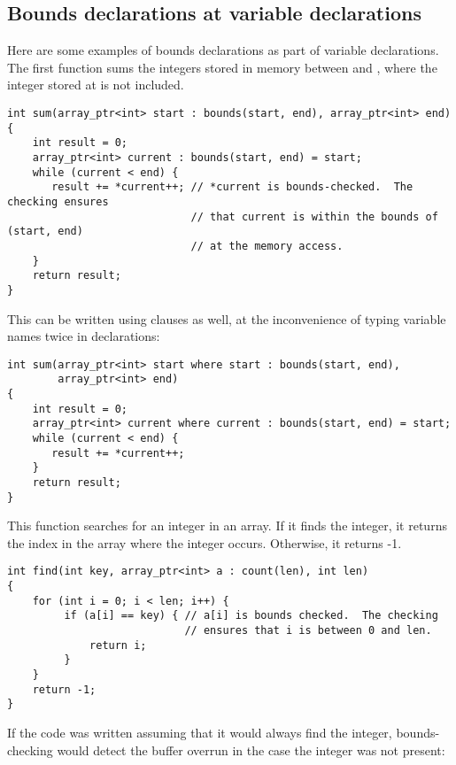 \subsection{Bounds declarations at variable declarations}
\label{section:variable-declarations}

Here are some examples of bounds declarations as part of variable
declarations. The first function sums the integers stored in memory
between  and , where the integer stored at
 is not included.

\begin{lstlisting}
int sum(array_ptr<int> start : bounds(start, end), array_ptr<int> end)
{ 
    int result = 0;
    array_ptr<int> current : bounds(start, end) = start;
    while (current < end) {
       result += *current++; // *current is bounds-checked.  The checking ensures 
                             // that current is within the bounds of (start, end) 
                             // at the memory access.                           
    }
    return result;
}
\end{lstlisting}

This can be written using  clauses as well, at the
inconvenience of typing variable names twice in declarations:

\begin{lstlisting}
int sum(array_ptr<int> start where start : bounds(start, end), 
        array_ptr<int> end)
{ 
    int result = 0;
    array_ptr<int> current where current : bounds(start, end) = start;
    while (current < end) {
       result += *current++;                          
    }
    return result;
}
\end{lstlisting}

This function searches for an integer in an array. If it finds the
integer, it returns the index in the array where the integer occurs.
Otherwise, it returns -1.

\begin{lstlisting}
int find(int key, array_ptr<int> a : count(len), int len)
{
    for (int i = 0; i < len; i++) {
         if (a[i] == key) { // a[i] is bounds checked.  The checking
                            // ensures that i is between 0 and len.
             return i;
         }
    }
    return -1;
}
\end{lstlisting}

If the code was written assuming that it would always find the integer,
bounds-checking would detect the buffer overrun in the case the integer
was not present:

